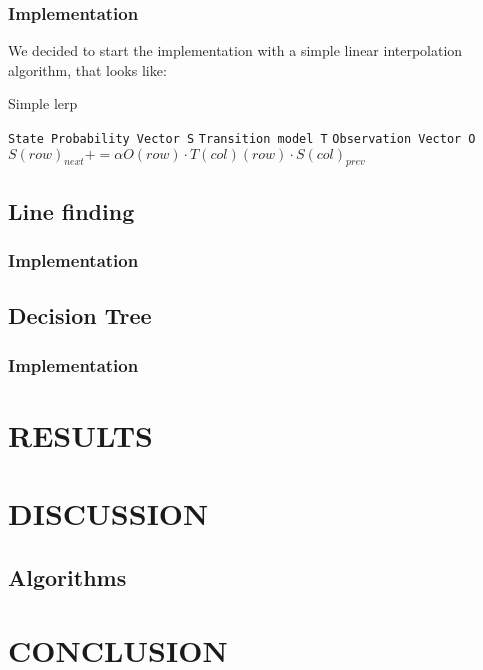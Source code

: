 \documentclass[a4paper, 10pt, conference]{ieeeconf}      %
\begin{document}
\subsubsection{Implementation}
We decided to start the implementation with a simple linear interpolation algorithm, that looks like:

\begin{algorithm}
  \caption{Simple lerp}\label{forward}
  \begin{algorithmic}[1]
      \State \texttt{State Probability Vector S}
      \State \texttt{Transition model T}
      \State \texttt{Observation Vector O}
      		\State $S(row)_{next} += \alpha O(row) \cdot T(col)(row) \cdot S(col)_{prev}$
      	\EndFor
      \EndFor
  \end{algorithmic}
\end{algorithm}

\subsection{Line finding}

\subsubsection{Implementation}

\subsection{Decision Tree}

\subsubsection{Implementation}

\section{RESULTS}

\section{DISCUSSION}

\subsection{Algorithms}

\section{CONCLUSION}
\end{document}
